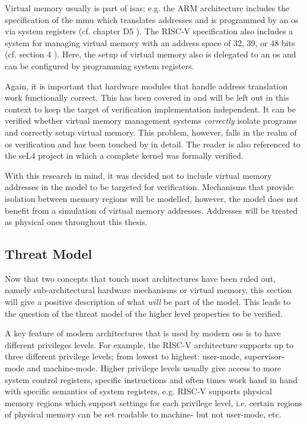 Virtual memory usually is part of \glspl{isa}; e.g. the ARM architecture includes the specification of the \gls{mmu} which translates addresses and is programmed by an \gls{os} via system registers (cf. chapter D5 \cite{Armv8}).
The RISC-V specification also includes a system for managing virtual memory with an address space of 32, 39, or 48 bits (cf. section 4 \cite{RiscVISAP}).
Here, the setup of virtual memory also is delegated to an \gls{os} and can be configured by programming system registers.

Again, it is important that hardware modules that handle address translation work functionally correct.
This has been covered in \cite{Dalinger05} and will be left out in this context to keep the target of verification implementation independent.
It can be verified whether virtual memory management systems \textit{correctly} isolate programs and correctly setup virtual memory.
This problem, however, falls in the realm of \gls{os} verification and has been touched by \cite{Vaynberg12} in detail.
The reader is also referenced to the seL4 project \cite{Klein09} in which a complete kernel was formally verified.

With this research in mind, it was decided not to include virtual memory addresses in the model to be targeted for verification.
Mechanisms that provide isolation between memory regions will be modelled, however, the model does not benefit from a simulation of virtual memory addresses.
Addresses will be treated as physical ones throughout this thesis.

\subsection{Threat Model}
\label{sec:threat-model}

Now that two concepts that touch most architectures have been ruled out, namely sub-architectural hardware mechanisms or virtual memory, this section will give a positive description of what \textit{will} be part of the model.
This leads to the question of the threat model of the higher level properties to be verified.

A key feature of modern architectures that is used by modern \glspl{os} is to have different privileges levels.
For example, the RISC-V architecture supports up to three different privilege levels; from lowest to highest: user-mode, supervisor-mode and machine-mode.
Higher privilege levels usually give access to more system control registers, specific instructions and often times work hand in hand with specific semantics of system registers, e.g. RISC-V supports physical memory regions which support settings for each privilege level, i.e. certain regions of physical memory can be set readable to machine- but not user-mode, etc.

